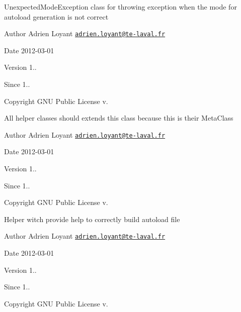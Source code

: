 Unexpected\-Mode\-Exception class for throwing exception when the mode for autoload generation is not correct

\begin{DoxyAuthor}{Author}
Adrien Loyant \href{mailto:adrien.loyant@te-laval.fr}{\tt adrien.\-loyant@te-\/laval.\-fr}
\end{DoxyAuthor}
\begin{DoxyDate}{Date}
2012-\/03-\/01 
\end{DoxyDate}
\begin{DoxyVersion}{Version}
1.. 
\end{DoxyVersion}
\begin{DoxySince}{Since}
1.. 
\end{DoxySince}
\begin{DoxyCopyright}{Copyright}
G\-N\-U Public License v.
\end{DoxyCopyright}


All helper classes should extends this class because this is their Meta\-Class

\begin{DoxyAuthor}{Author}
Adrien Loyant \href{mailto:adrien.loyant@te-laval.fr}{\tt adrien.\-loyant@te-\/laval.\-fr}
\end{DoxyAuthor}
\begin{DoxyDate}{Date}
2012-\/03-\/01 
\end{DoxyDate}
\begin{DoxyVersion}{Version}
1.. 
\end{DoxyVersion}
\begin{DoxySince}{Since}
1.. 
\end{DoxySince}
\begin{DoxyCopyright}{Copyright}
G\-N\-U Public License v.
\end{DoxyCopyright}


Helper witch provide help to correctly build autoload file

\begin{DoxyAuthor}{Author}
Adrien Loyant \href{mailto:adrien.loyant@te-laval.fr}{\tt adrien.\-loyant@te-\/laval.\-fr}
\end{DoxyAuthor}
\begin{DoxyDate}{Date}
2012-\/03-\/01 
\end{DoxyDate}
\begin{DoxyVersion}{Version}
1.. 
\end{DoxyVersion}
\begin{DoxySince}{Since}
1.. 
\end{DoxySince}
\begin{DoxyCopyright}{Copyright}
G\-N\-U Public License v.
\end{DoxyCopyright}


